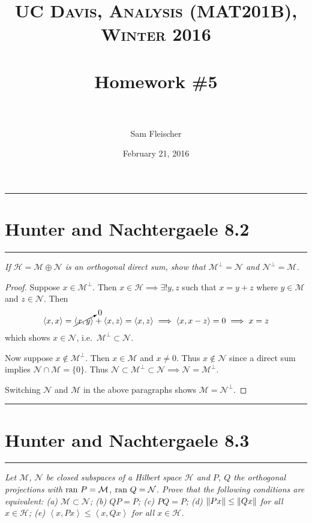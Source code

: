 \documentclass{article} %
\title{ 
\normalfont \normalsize 
\textsc{UC Davis, Analysis (MAT201B), Winter 2016} \\ [25pt] %
\horrule{2pt} \\[0.4cm] %
\Huge Homework \#5 \\ %
\horrule{2pt} \\[0.5cm] %
}
\author{\huge Sam Fleischer} %
\date{February 21, 2016} %
\theoremstyle{plain}
\newcommand{\VEC}[2]{\left\langle #1, #2 \right\rangle}
\newcommand{\ran}{\text{\rm ran }}
\newcommand{\problem}[1]{
\vspace{.375cm}
\begin{minipage}{\textwidth}
    \begin{center}
        \noindent\rule{5cm}{1pt}
    \end{center}
    \section{\bf #1}
    \begin{center}
        \noindent\rule{5cm}{1pt}
    \end{center}
    \vspace{0.25cm}
\end{minipage}
}
\numberwithin{equation}{section} %
\numberwithin{figure}{section} %
\numberwithin{table}{section} %
\begin{document}
\thispagestyle{empty}

\maketitle %

\makeatletter
{}
\makeatother

\pagebreak

\problem{Hunter and Nachtergaele 8.2}
\emph{If $\mathcal{H} = \mathcal{M} \oplus \mathcal{N}$ is an orthogonal direct sum, show that $\mathcal{M}^\perp = \mathcal{N}$ and $\mathcal{N}^\perp = \mathcal{M}$.}

\begin{proof}
    Suppose $x \in \mathcal{M}^\perp$.  Then $x \in \mathcal{H} \implies \exists!y, z$ such that $x = y + z$ where $y \in \mathcal{M}$ and $z \in \mathcal{N}$.  Then
    \begin{align*}
        \VEC{x}{x} = \cancelto{0}{\VEC{x}{y}} + \VEC{x}{z} = \VEC{x}{z} \implies \VEC{x}{x-z} = 0 \implies x = z
    \end{align*}
    which shows $x \in \mathcal{N}$, i.e.~$\mathcal{M}^\perp \subset \mathcal{N}$.

    Now suppose $x \not\in \mathcal{M}^\perp$.  Then $x \in \mathcal{M}$ and $x \neq 0$.  Thus $x \not\in \mathcal{N}$ since a direct sum implies $\mathcal{N} \cap \mathcal{M} = \{0\}$.  Thus $\mathcal{N} \subset \mathcal{M}^\perp \subset \mathcal{N} \implies \mathcal{N} = \mathcal{M}^\perp$.

    Switching $\mathcal{N}$ and $\mathcal{M}$ in the above paragraphs shows $\mathcal{M} = \mathcal{N}^\perp$.
\end{proof}









\problem{Hunter and Nachtergaele 8.3}
\emph{Let $\mathcal{M}$, $\mathcal{N}$ be closed subspaces of a Hilbert space $\mathcal{H}$ and $P$, $Q$ the orthogonal projections with $\ran P = \mathcal{M}$, $\ran Q = \mathcal{N}$.  Prove that the following conditions are equivalent: (a) $\mathcal{M} \subset \mathcal{N}$; (b) $QP = P$; (c) $PQ = P$; (d) $\norm{Px} \leq \norm{Qx}$ for all $x \in \mathcal{H}$; (e) $\VEC{x}{Px} \leq \VEC{x}{Qx}$ for all $x \in \mathcal{H}$.}
\end{document}
